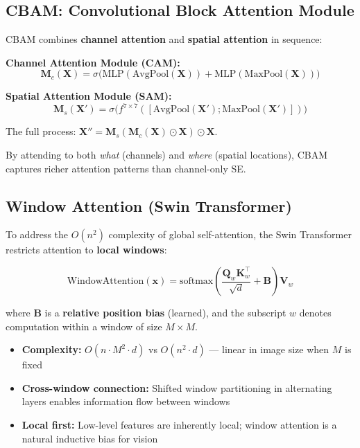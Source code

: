 \subsection{CBAM: Convolutional Block Attention Module}

CBAM \cite{woo2018cbam} combines \textbf{channel attention} and \textbf{spatial attention} in sequence:

\textbf{Channel Attention Module (CAM):}
\begin{equation}
\mathbf{M}_c(\mathbf{X}) = \sigma\bigl(\text{MLP}(\text{AvgPool}(\mathbf{X})) + \text{MLP}(\text{MaxPool}(\mathbf{X}))\bigr)
\end{equation}

\textbf{Spatial Attention Module (SAM):}
\begin{equation}
\mathbf{M}_s(\mathbf{X'}) = \sigma\bigl(f^{7 \times 7}([\text{AvgPool}(\mathbf{X'}); \text{MaxPool}(\mathbf{X'})])\bigr)
\end{equation}

The full process: $\mathbf{X}'' = \mathbf{M}_s(\mathbf{M}_c(\mathbf{X}) \odot \mathbf{X}) \odot \mathbf{X}$.

By attending to both \emph{what} (channels) and \emph{where} (spatial locations), CBAM captures richer attention patterns than channel-only SE.

\subsection{Window Attention (Swin Transformer)}

To address the $O(n^2)$ complexity of global self-attention, the Swin Transformer \cite{liu2021swin} restricts attention to \textbf{local windows}:

\begin{equation}
\text{WindowAttention}(\mathbf{x}) = \text{softmax}\left(\frac{\mathbf{Q}_w \mathbf{K}_w^\top}{\sqrt{d}} + \mathbf{B}\right)\mathbf{V}_w
\end{equation}

where $\mathbf{B}$ is a \textbf{relative position bias} (learned), and the subscript $w$ denotes computation within a window of size $M \times M$.

\begin{properties}
\begin{itemize}
    \item \textbf{Complexity:} $O(n \cdot M^2 \cdot d)$ vs $O(n^2 \cdot d)$ --- linear in image size when $M$ is fixed
    \item \textbf{Cross-window connection:} Shifted window partitioning in alternating layers enables information flow between windows
    \item \textbf{Local first:} Low-level features are inherently local; window attention is a natural inductive bias for vision
\end{itemize}
\end{properties}

